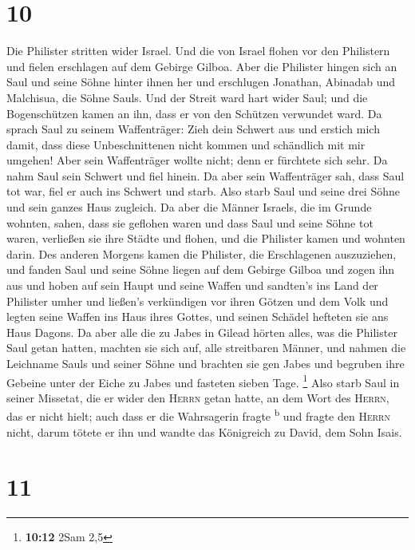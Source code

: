 \hypertarget{section-9}{%
\section{10}\label{section-9}}

 Die Philister stritten wider Israel. Und die von Israel
flohen vor den Philistern und fielen erschlagen auf dem Gebirge Gilboa.
 Aber die Philister hingen sich an Saul und seine Söhne
hinter ihnen her und erschlugen Jonathan, Abinadab und Malchisua, die
Söhne Sauls.  Und der Streit ward hart wider Saul; und die
Bogenschützen kamen an ihn, dass er von den Schützen verwundet ward.
 Da sprach Saul zu seinem Waffenträger: Zieh dein Schwert
aus und erstich mich damit, dass diese Unbeschnittenen nicht kommen und
schändlich mit mir umgehen! Aber sein Waffenträger wollte nicht; denn er
fürchtete sich sehr. Da nahm Saul sein Schwert und fiel hinein.
 Da aber sein Waffenträger sah, dass Saul tot war, fiel er
auch ins Schwert und starb.  Also starb Saul und seine
drei Söhne und sein ganzes Haus zugleich.  Da aber die
Männer Israels, die im Grunde wohnten, sahen, dass sie geflohen waren
und dass Saul und seine Söhne tot waren, verließen sie ihre Städte und
flohen, und die Philister kamen und wohnten darin.  Des
anderen Morgens kamen die Philister, die Erschlagenen auszuziehen, und
fanden Saul und seine Söhne liegen auf dem Gebirge Gilboa 
und zogen ihn aus und hoben auf sein Haupt und seine Waffen und
sandten's ins Land der Philister umher und ließen's verkündigen vor
ihren Götzen und dem Volk  und legten seine Waffen ins
Haus ihres Gottes, und seinen Schädel hefteten sie ans Haus Dagons.
 Da aber alle die zu Jabes in Gilead hörten alles, was
die Philister Saul getan hatten,  machten sie sich auf,
alle streitbaren Männer, und nahmen die Leichname Sauls und seiner Söhne
und brachten sie gen Jabes und begruben ihre Gebeine unter der Eiche zu
Jabes und fasteten sieben Tage. \footnote{\textbf{10:12} 2Sam 2,5}
 Also starb Saul in seiner Missetat, die er wider den
\textsc{Herrn} getan hatte, an dem Wort des \textsc{Herrn}, das er nicht
hielt; auch dass er die Wahrsagerin fragte \textsuperscript{b}
 und fragte den \textsc{Herrn} nicht, darum tötete er ihn
und wandte das Königreich zu David, dem Sohn Isais.

\hypertarget{section-10}{%
\section{11}\label{section-10}}

